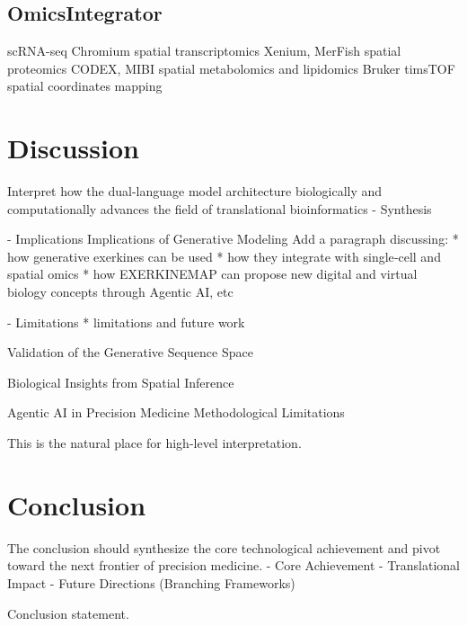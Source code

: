 \documentclass[11pt]{article}
\begin{document}
\subsection{OmicsIntegrator}
scRNA-seq
Chromium
spatial transcriptomics
Xenium, MerFish
spatial proteomics
CODEX, MIBI
spatial metabolomics and lipidomics
Bruker timsTOF
spatial coordinates mapping

\section{Discussion}
Interpret how the dual-language model architecture biologically and computationally advances the field of translational bioinformatics
- Synthesis

- Implications
Implications of Generative Modeling
Add a paragraph discussing:
* how generative exerkines can be used
* how they integrate with single‑cell and spatial omics
* how EXERKINEMAP can propose new digital and virtual biology concepts through Agentic AI, etc

- Limitations
* limitations and future work

Validation of the Generative Sequence Space

Biological Insights from Spatial Inference

Agentic AI in Precision Medicine
Methodological Limitations

This is the natural place for high‑level interpretation.
\section{Conclusion}
The conclusion should synthesize the core technological achievement and pivot toward the next frontier of precision medicine.
- Core Achievement
- Translational Impact
- Future Directions (Branching Frameworks)

Conclusion statement.
\end{document}

